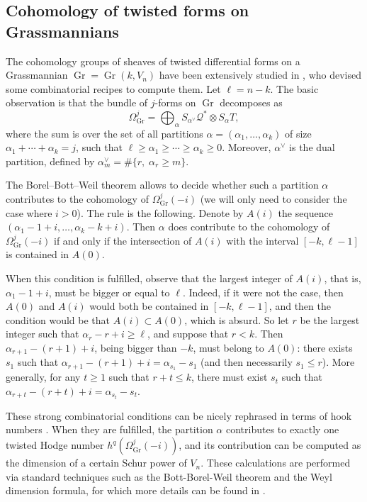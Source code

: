 \documentclass[11pt]{article}
\let\mathcal\mathscr
\theoremstyle{plain}
\theoremstyle{definition}
\DeclareMathOperator{\Gr}{Gr}
\newcommand{\sheaf}[1]{\mathcal{#1}}
\newcommand{\kq}{\sheaf{Q}}
\begin{document}
\subsection{Cohomology of twisted forms on Grassmannians} \label{twisted}
The cohomology groups of sheaves of twisted differential forms on a Grassmannian
$\Gr=\Gr(k,V_n)$ have been extensively studied in \cite{snow}, who devised some combinatorial recipes to compute them. Let $\ell=n-k$.
The basic observation is that the bundle of $j$-forms on $\Gr$
decomposes as
\[
\Omega^j_{\Gr} = \bigoplus_\alpha S_{\alpha^\vee}\kq^*\otimes S_\alpha T,
\]
where the sum is over the set of all partitions $\alpha=(\alpha_1,\ldots, \alpha_k)$
of size $\alpha_1+\cdots +\alpha_k=j$, such that $\ell\ge \alpha_1\ge \cdots\ge \alpha_k\ge 0$.
Moreover, $\alpha^\vee$ is the dual partition, defined by $\alpha^\vee_m=\#\{r, \; \alpha_r\ge m\}$.

The Borel--Bott--Weil theorem allows to decide whether such a partition $\alpha$ contributes to
the cohomology of $\Omega^j_{\Gr}(-i)$ (we will only need to consider the case where
$i>0$). The rule is the following.
Denote by $A(i)$ the sequence $(\alpha_1-1+i,\ldots ,\alpha_k-k+i)$.
Then $\alpha$ does contribute to the cohomology of $\Omega_{\Gr}^j(-i)$ if and only if
the intersection of $A(i)$ with the interval $[-k,\ell-1]$ is contained in $A(0)$.

When this condition is fulfilled, observe that the largest integer
of $A(i)$, that is, $\alpha_1-1+i$, must be bigger or equal to $\ell$. Indeed, if it
were not the case, then $A(0)$ and $A(i)$ would both be contained in $[-k,\ell-1]$,
and then the condition would be that $A(i)\subset A(0)$, which is absurd. So let $r$ be the
largest integer such that $\alpha_r-r+i\ge \ell$, and suppose that $r<k$. Then $\alpha_{r+1}-(r+1)+i$, being bigger than $-k$, must belong to $A(0)$:
there exists $s_1$ such that $\alpha_{r+1}-(r+1)+i=\alpha_{s_1}-s_1$ (and then necessarily
$s_1\le r$). More generally, for any $t\ge 1$ such that $r+t\le k$, there must exist $s_t$ such that $\alpha_{r+t}-(r+t)+i=\alpha_{s_t}-s_t$.

These strong combinatorial conditions can be nicely rephrased in terms
of hook numbers \cite{snow}. When they are fulfilled, the partition $\alpha$ contributes
to exactly one twisted Hodge number $h^q(\Omega^j_{\Gr}(-i))$, and its contribution can
be computed as the dimension of a certain Schur power of $V_n$.
These calculations are performed via standard techniques such as the Bott-Borel-Weil theorem
and the Weyl dimension formula, for which more details can be found in \cite{weyman-book}.
\end{document}
